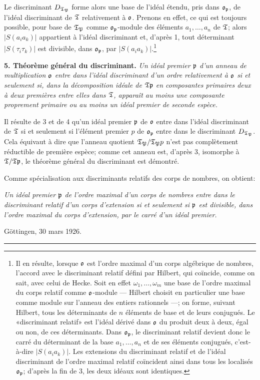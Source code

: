 Le discriminant $D_{\mathfrak T_\mathfrak P}$ forme alors une base de l'idéal étendu, pris dans $\mathfrak o_\mathfrak p$, de l'idéal discriminant de $\mathfrak T$ relativement à $\mathfrak o$. Prenons en effet, ce qui est toujours possible, pour base de $\mathfrak T_\mathfrak P$ comme $\mathfrak o_\mathfrak p$-module des éléments $a_1,\ldots,a_n$ de $\mathfrak T$; alors $|S(a_i a_k)|$ appartient à l'idéal discriminant et, d'après 1, tout déterminant $|S(\tau_i\tau_k)|$ est divisible, dans $\mathfrak o_\mathfrak p$, par $|S(a_i a_k)|$.\footnote{Il en résulte, lorsque $\mathfrak o$ est l'ordre maximal d'un corps algébrique de nombres, l'accord avec le discriminant relatif défini par Hilbert, qui coïncide, comme on sait, avec celui de Hecke. Soit en effet $\omega_1,\ldots,\omega_m$ une base de l'ordre maximal du corps relatif comme $\mathfrak o$-module --- Hilbert choisit en particulier une base comme module sur l'anneau des entiers rationnels ---; on forme, suivant Hilbert, tous les déterminants de $n$ éléments de base et de leurs conjugués. Le «discriminant relatif» est l'idéal dérivé dans $\mathfrak o$ du produit deux à deux, égal ou non, de ces déterminants. Dans $\mathfrak o_\mathfrak p$, le discriminant relatif devient donc le carré du déterminant de la base $a_1,\ldots,a_n$ et de ses éléments conjugués, c'est-à-dire $|S(a_i a_k)|$. Les extensions du discriminant relatif et de l'idéal discriminant de l'ordre maximal relatif coïncident ainsi dans tous les localisés $\mathfrak o_\mathfrak p$; d'après la fin de 3, les deux idéaux sont identiques.}

\textbf{5. Théorème général du discriminant.} \emph{Un idéal premier $\mathfrak p$ d'un anneau de multiplication $\mathfrak o$ entre dans l'idéal discriminant d'un ordre relativement à $\mathfrak o$ si et seulement si, dans la décomposition idéale de $\mathfrak T\mathfrak p$ en composantes primaires deux à deux premières entre elles dans $\mathfrak T$, apparaît au moins une composante proprement primaire ou au moins un idéal premier de seconde espèce.}

Il résulte de 3 et de 4 qu'un idéal premier $\mathfrak p$ de $\mathfrak o$ entre dans l'idéal discriminant de $\mathfrak T$ si et seulement si l'élément premier $p$ de $\mathfrak o_\mathfrak p$ entre dans le discriminant $D_{\mathfrak T_\mathfrak P}$. Cela équivaut à dire que l'anneau quotient $\mathfrak T_\mathfrak P/\mathfrak T_\mathfrak P p$ n'est pas complètement réductible de première espèce; comme cet anneau est, d'après 3, isomorphe à $\mathfrak T/\mathfrak T\mathfrak p$, le théorème général du discriminant est démontré.

Comme spécialisation aux discriminants relatifs des corps de nombres, on obtient:

\emph{Un idéal premier $\mathfrak p$ de l'ordre maximal d'un corps de nombres entre dans le discriminant relatif d'un corps d'extension si et seulement si $\mathfrak p$ est divisible, dans l'ordre maximal du corps d'extension, par le carré d'un idéal premier.}

Göttingen, 30 mars 1926.

\begin{center}
\rule{9em}{0.4pt}
\end{center}
